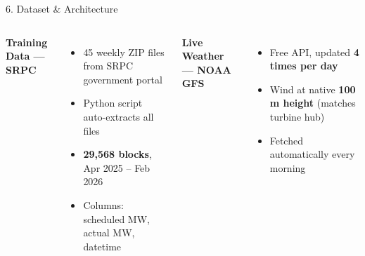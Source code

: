 \documentclass[aspectratio=169,10pt]{beamer}
\begin{document}
\begin{frame}{6. \; Dataset \& Architecture}
  \begin{columns}[T]
      \textbf{\color{darkblue}\small Training Data --- SRPC}\\[5pt]
      \begin{itemize}\setlength\itemsep{4pt}\small
        \item 45 weekly ZIP files from SRPC government portal
        \item Python script auto-extracts all files
        \item \textbf{29,568 blocks}, Apr 2025 -- Feb 2026
        \item Columns: scheduled MW, actual MW, datetime
      \end{itemize}
      \vspace{7pt}
      \textbf{\color{darkblue}\small Live Weather --- NOAA GFS}\\[5pt]
      \begin{itemize}\setlength\itemsep{4pt}\small
        \item Free API, updated \textbf{4 times per day}
        \item Wind at native \textbf{100 m height} (matches turbine hub)
        \item Fetched automatically every morning
      \end{itemize}


\end{columns}
\end{frame}
\end{document}
